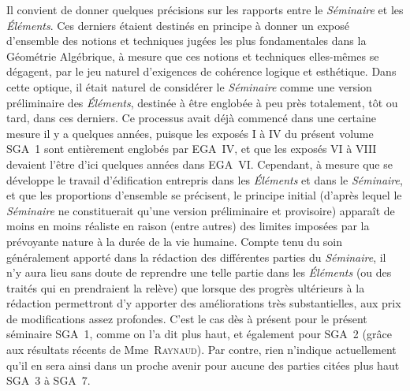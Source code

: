 Il convient de donner quelques pr\'ecisions sur les rapports entre
le \emph{Séminaire} et les \emph{Éléments}. Ces derniers
\'etaient destin\'es en principe \`a donner un expos\'e
d'ensemble des notions et techniques jug\'ees les plus fondamentales
dans la G\'eom\'etrie Alg\'ebrique, \`a mesure que ces notions
et techniques elles-m\^emes se d\'egagent, par le jeu naturel
d'exigences de coh\'erence logique et esth\'etique. Dans cette
optique, il \'etait naturel de consid\'erer le
\emph{Séminaire} comme une version pr\'eliminaire des
\emph{Éléments}, destin\'ee \`a \^etre englob\'ee \`a
peu pr\`es totalement, t\^ot ou tard, dans ces derniers. Ce
processus avait d\'ej\`a commenc\'e dans une certaine mesure il
y a quelques ann\'ees, puisque les expos\'es I \`a IV du
pr\'esent volume SGA~1 sont enti\`erement englob\'es par EGA~IV,
et que les expos\'es VI \`a VIII devaient l'\^etre d'ici
quelques ann\'ees dans EGA~VI. Cependant, \`a mesure que se
d\'eveloppe le travail d'\'edification entrepris dans les
\emph{Éléments} et dans le \emph{Séminaire}, et que les
proportions d'ensemble se pr\'ecisent, le principe initial
(d'apr\`es lequel le \emph{Séminaire} ne constituerait qu'une
version pr\'eliminaire et provisoire) appara\^it de moins en
moins r\'ealiste en raison (entre autres) des limites impos\'ees
par la pr\'evoyante nature \`a la dur\'ee de la vie
humaine. Compte tenu du soin g\'en\'eralement apport\'e dans la
r\'edaction des diff\'erentes parties du \emph{Séminaire}, il
n'y aura lieu sans doute de reprendre une telle partie dans les
\emph{Éléments} (ou des trait\'es qui en prendraient la
rel\`eve) que lorsque des progr\`es ult\'erieurs \`a la
r\'edaction permettront d'y apporter des am\'eliorations tr\`es
substantielles, aux prix de modifications assez profondes. C'est le
cas d\`es \`a pr\'esent pour le pr\'esent s\'eminaire SGA~1,
comme on l'a dit plus haut, et \'egalement pour SGA~2 (gr\^ace aux
r\'esultats r\'ecents de Mme~\textsc{Raynaud}). Par contre, rien n'indique
actuellement qu'il en sera ainsi dans un proche avenir pour aucune des
parties cit\'ees plus haut SGA~3 \`a SGA~7.

